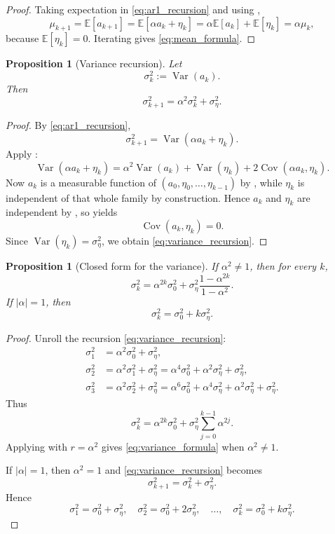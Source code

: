 \documentclass[11pt]{article}
\numberwithin{equation}{section}
\newtheorem{proposition}[theorem]{Proposition}
\theoremstyle{definition}
\theoremstyle{remark}
\newcommand{\E}{\mathbb{E}}
\newcommand{\Var}{\operatorname{Var}}
\newcommand{\Cov}{\operatorname{Cov}}
\begin{document}
\begin{proof}
Taking expectation in \eqref{eq:ar1_recursion} and using ,
\[
\mu_{k+1}=\E[a_{k+1}]
=\E[\alpha a_k+\eta_k]
=\alpha\E[a_k]+\E[\eta_k]
=\alpha\mu_k,
\]
because $\E[\eta_k]=0$. Iterating gives \eqref{eq:mean_formula}.
\end{proof}

\begin{proposition}[Variance recursion]\label{prop:variance_recursion}
Let
\[
\sigma_k^2:=\Var(a_k).
\]
Then
\begin{equation}\label{eq:variance_recursion}
\sigma_{k+1}^2=\alpha^2\sigma_k^2+\sigma_\eta^2.
\end{equation}
\end{proposition}

\begin{proof}
By \eqref{eq:ar1_recursion},
\[
\sigma_{k+1}^2=\Var(\alpha a_k+\eta_k).
\]
Apply :
\[
\Var(\alpha a_k+\eta_k)=\alpha^2\Var(a_k)+\Var(\eta_k)+2\Cov(\alpha a_k,\eta_k).
\]
Now $a_k$ is a measurable function of $(a_0,\eta_0,\dots,\eta_{k-1})$ by , while $\eta_k$ is independent of that whole family by construction. Hence $a_k$ and $\eta_k$ are independent by , so  yields
\[
\Cov(a_k,\eta_k)=0.
\]
Since $\Var(\eta_k)=\sigma_\eta^2$, we obtain \eqref{eq:variance_recursion}.
\end{proof}

\begin{proposition}[Closed form for the variance]\label{prop:variance_formula}
If $\alpha^2\neq 1$, then for every $k$,
\begin{equation}\label{eq:variance_formula}
\sigma_k^2=\alpha^{2k}\sigma_0^2+\sigma_\eta^2\frac{1-\alpha^{2k}}{1-\alpha^2}.
\end{equation}
If $|\alpha|=1$, then
\begin{equation}\label{eq:variance_alpha_one}
\sigma_k^2=\sigma_0^2+k\sigma_\eta^2.
\end{equation}
\end{proposition}

\begin{proof}
Unroll the recursion \eqref{eq:variance_recursion}:
\begin{align*}
\sigma_1^2&=\alpha^2\sigma_0^2+\sigma_\eta^2,\\
\sigma_2^2&=\alpha^2\sigma_1^2+\sigma_\eta^2
=\alpha^4\sigma_0^2+\alpha^2\sigma_\eta^2+\sigma_\eta^2,\\
\sigma_3^2&=\alpha^2\sigma_2^2+\sigma_\eta^2
=\alpha^6\sigma_0^2+\alpha^4\sigma_\eta^2+\alpha^2\sigma_\eta^2+\sigma_\eta^2.
\end{align*}
Thus
\[
\sigma_k^2=\alpha^{2k}\sigma_0^2+\sigma_\eta^2\sum_{j=0}^{k-1}\alpha^{2j}.
\]
Applying  with $r=\alpha^2$ gives \eqref{eq:variance_formula} when $\alpha^2\neq 1$.

If $|\alpha|=1$, then $\alpha^2=1$ and \eqref{eq:variance_recursion} becomes
\[
\sigma_{k+1}^2=\sigma_k^2+\sigma_\eta^2.
\]
Hence
\[
\sigma_1^2=\sigma_0^2+\sigma_\eta^2,\quad
\sigma_2^2=\sigma_0^2+2\sigma_\eta^2,\quad \dots,\quad
\sigma_k^2=\sigma_0^2+k\sigma_\eta^2.
\]
\end{proof}
\end{document}
